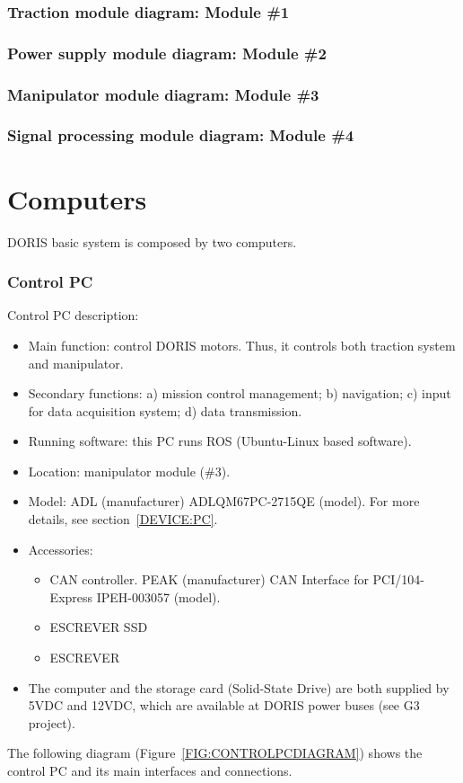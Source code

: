 \subsubsection{Traction module diagram: Module \#1}
\subsubsection{Power supply module diagram: Module \#2}
\subsubsection{Manipulator module diagram: Module \#3}
\subsubsection{Signal processing module diagram: Module \#4}

\section{Computers}
DORIS basic system is composed by two computers.

\subsubsection{Control PC}
Control PC description:
  \begin{itemize}
    \item Main function: control DORIS motors. Thus, it controls both traction system and manipulator.
    \item Secondary functions: a) mission control management; b) navigation; c) input for data acquisition system; d) data transmission.
    \item Running software: this PC runs ROS (Ubuntu-Linux based software).
    \item Location: manipulator module (\#3).
    \item Model: ADL (manufacturer) ADLQM67PC-2715QE (model). For more details, see section~\ref{DEVICE:PC}.
    \item Accessories:
    \begin{itemize}
      \item CAN controller. PEAK (manufacturer) CAN Interface for PCI/104-Express IPEH-003057 (model).
      \item ESCREVER SSD
      \item ESCREVER
    \end{itemize}
    \item The computer and the storage card (Solid-State Drive) are both supplied by 5VDC and 12VDC, which are available at DORIS power buses (see G3 project).
  \end{itemize}
The following diagram (Figure~\ref{FIG:CONTROLPCDIAGRAM}) shows the control PC and its main interfaces and connections.

